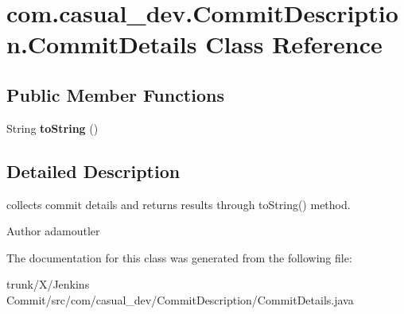 \hypertarget{classcom_1_1casual__dev_1_1_commit_description_1_1_commit_details}{\section{com.\-casual\-\_\-dev.\-Commit\-Description.\-Commit\-Details Class Reference}
\label{classcom_1_1casual__dev_1_1_commit_description_1_1_commit_details}
}
\subsection*{Public Member Functions}
\begin{DoxyCompactItemize}
\item 
\hypertarget{classcom_1_1casual__dev_1_1_commit_description_1_1_commit_details_a114735e61da1ec4b4b16cca18af9e04e}{String {\bfseries to\-String} ()}\label{classcom_1_1casual__dev_1_1_commit_description_1_1_commit_details_a114735e61da1ec4b4b16cca18af9e04e}

\end{DoxyCompactItemize}


\subsection{Detailed Description}
collects commit details and returns results through to\-String() method.

\begin{DoxyAuthor}{Author}
adamoutler 
\end{DoxyAuthor}


The documentation for this class was generated from the following file\-:\begin{DoxyCompactItemize}
\item 
trunk/\-X/\-Jenkins Commit/src/com/casual\-\_\-dev/\-Commit\-Description/Commit\-Details.\-java\end{DoxyCompactItemize}
